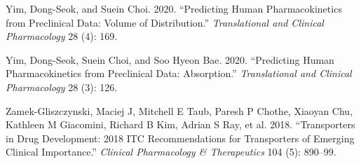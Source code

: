 \documentclass[
  11pt,
  krantz2, a4paper, twoside]{krantz}
\newlength{\cslhangindent}
\newenvironment{CSLReferences}[2] %
 {\begin{list}{}{%
  \setlength{\itemindent}{0pt}
  \setlength{\leftmargin}{0pt}
  \setlength{\parsep}{0pt}
  \ifodd #1
   \setlength{\leftmargin}{\cslhangindent}
   \setlength{\itemindent}{-1\cslhangindent}
  \fi
  \setlength{\itemsep}{#2\baselineskip}}}
 {\end{list}}
\begin{document}
\begin{CSLReferences}{1}{0}
Yim, Dong-Seok, and Suein Choi. 2020. {``Predicting Human Pharmacokinetics from Preclinical Data: Volume of Distribution.''} \emph{Translational and Clinical Pharmacology} 28 (4): 169.

Yim, Dong-Seok, Suein Choi, and Soo Hyeon Bae. 2020. {``Predicting Human Pharmacokinetics from Preclinical Data: Absorption.''} \emph{Translational and Clinical Pharmacology} 28 (3): 126.

Zamek-Gliszczynski, Maciej J, Mitchell E Taub, Paresh P Chothe, Xiaoyan Chu, Kathleen M Giacomini, Richard B Kim, Adrian S Ray, et al. 2018. {``Transporters in Drug Development: 2018 ITC Recommendations for Transporters of Emerging Clinical Importance.''} \emph{Clinical Pharmacology \& Therapeutics} 104 (5): 890--99.

\end{CSLReferences}

\printindex
\end{document}
